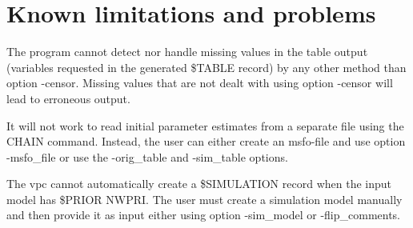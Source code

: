 \section{Known limitations and problems}
The program cannot detect nor handle missing values in the table output (variables 
requested in the generated \$TABLE record) by any other method than option -censor. Missing values that are not dealt with using option -censor will lead to erroneous output. 

It will not work to read initial parameter estimates from a separate file using the CHAIN command. Instead, the user can either create an msfo-file and use option -msfo\_file or use the -orig\_table and -sim\_table options.

The vpc cannot automatically create a \$SIMULATION record when the input model has \$PRIOR NWPRI. The user must create a simulation model manually and then
provide it as input either using option -sim\_model or -flip\_comments.



